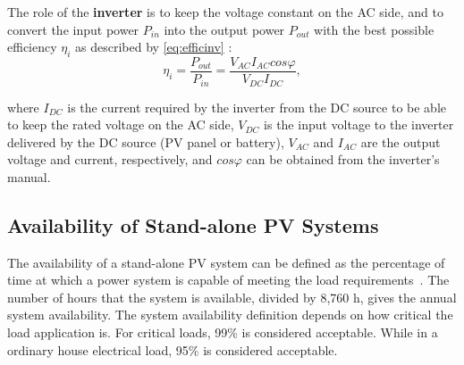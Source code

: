 The role of the \textbf{inverter} is to keep the voltage constant on the AC side, %
and to convert the input power $ P_{in} $ into the output power $ P_{out} $ with the best possible efficiency $ \eta_{i} $ as described by \eqref{eq:efficinv} \cite{Hansen}:
%
\begin{equation}
\label{eq:efficinv}
\eta_{i} = \dfrac{P_{out}}{P_{in}} = \dfrac{V_{AC} I_{AC} cos\varphi}{V_{DC}I_{DC}},
\end{equation}

\noindent where $ I_{DC} $ is the current required by the inverter from the DC source to be able to keep the rated voltage on the AC side, $ V_{DC} $ is the input voltage to the inverter delivered by the DC source (PV panel or battery),  $ V_{AC}  $ and $ I_{AC} $ are the output voltage and current, respectively, and $ cos \varphi $ can be obtained from the inverter's manual.

%
%
\subsection{Availability of Stand-alone PV Systems}
\label{sec:availability}
The availability of a stand-alone PV system can be defined as the percentage of time at which a power system is capable of meeting the load requirements~\cite{Khatib2014}. The number of hours that the system is available, divided by 8,760 h, gives the annual system availability.
The system availability definition depends on how critical the load application is. For critical loads, 99\% is considered acceptable. While in a ordinary house electrical load, 95\% is considered acceptable. %
%
%
